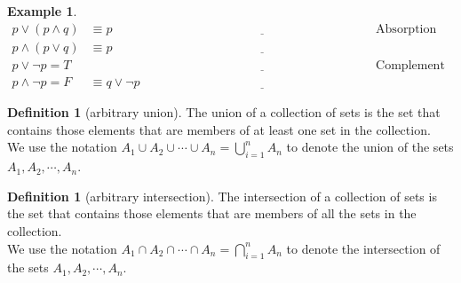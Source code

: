 \documentclass[letterpaper,10pt]{article}
\theoremstyle{plain}
\theoremstyle{definition}
\newtheorem{defn}[thm]{Definition}
\newtheorem{exmp}[thm]{Example}
\theoremstyle{remark}
\providecommand{\land}{\ensuremath{\wedge}}
\providecommand{\lor}{\ensuremath{\vee}}
\providecommand{\intersect}{\ensuremath{\bigcap}}
\providecommand{\union}{\ensuremath{\bigcup}}
\begin{document}
\begin{exmp}
\begin{align}
p \lor (p \land q) & \equiv p &\underline{\hspace{5cm}}\hspace{1cm}& \text{Absorption Laws}\\
p \land (p \lor q)& \equiv p &\underline{\hspace{5cm}}\hspace{1cm}&\\
p \lor \lnot p= T  &\hspace{3cm}&\underline{\hspace{5cm}}\hspace{1cm}& \text{Complement Laws}\\
p \land \lnot p=F & \equiv q \lor \lnot p   &\underline{\hspace{5cm}}\hspace{1cm}&
\end{align}
\end{exmp}
\begin{defn}[arbitrary union]
The union of a collection of sets is the set that contains those elements that are members of
at least one set in the collection.\\
We use the notation
$A_1\cup A_2 \cup \cdots \cup A_n = \union_{i=1}^{n}A_n$
to denote the union of the sets $A_1,A_2, \cdots, A_n$.
\end{defn}
\begin{defn}[arbitrary intersection]
The intersection of a collection of sets is the set that contains those elements that are members
of all the sets in the collection.\\
We use the notation
$A_1\cap A_2 \cap \cdots \cap A_n = \intersect_{i=1}^{n}A_n$
to denote the intersection of the sets $A_1,A_2, \cdots, A_n$.
\end{defn}
\end{document}
